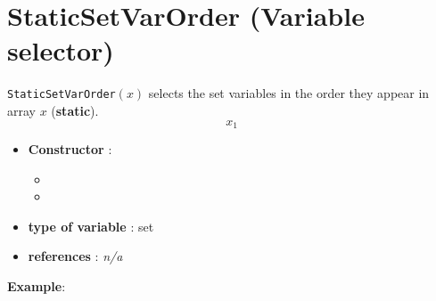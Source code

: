 \section{StaticSetVarOrder (Variable selector)}\label{staticsetvarorder:staticsetvarordervarselector}\hypertarget{staticsetvarorder:staticsetvarordervarselector}{}
\begin{notedef}
  \texttt{StaticSetVarOrder}$(x)$ selects the set variables in the order they appear in array $x$ (\textbf{static}).
$$x_1$$
\end{notedef}

\begin{itemize}
	\item \textbf{Constructor} : 
	\begin{itemize}
	\item {}
	\item {}
	\end{itemize}	
	\item \textbf{type of variable} : set
	\item \textbf{references} : \emph{n/a}
\end{itemize}

\textbf{Example}:
%

